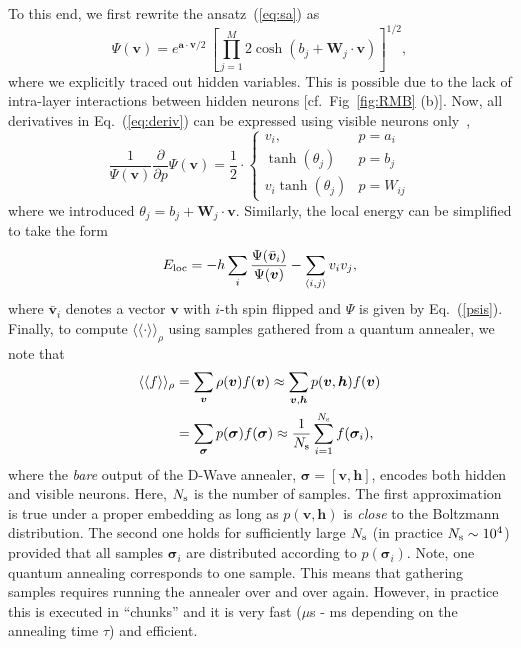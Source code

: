 \documentclass[aps,pra,showpacs,amsmath,amssymb,amsfonts,superscriptaddress,lengthcheck,longbibliography, twocolumn]{revtex4-1}
\newcommand{\bfm}{\boldsymbol}
\begin{document}
To this end, we first rewrite the ansatz~(\ref{eq:sa}) as 
%
\begin{equation}
\Psi(\bfm v) = e^{\bfm a \cdot \bfm v / 2} \, \left[ \prod_{j=1}^M 2 \cosh\left(b_j + \bfm W_{j} \cdot \bfm v\right)\right]^{1/2},
\label{psis}
\end{equation}
%
where we explicitly traced out hidden variables. This is possible due to the lack of intra-layer interactions between  hidden
neurons [cf.~Fig~\ref{fig:RMB}{\color{blue} (b)}]. Now, all derivatives in Eq.~(\ref{eq:deriv}) can be expressed using visible neurons only~\cite{Carleo17},
%
\begin{equation}
   \frac{1}{\Psi(\bfm v)}\frac{\partial}{\partial p} \Psi(\bfm v)  = \frac{1}{2} \cdot
      \begin{cases}
           v_i, &  p = a_i \\
            \tanh\left(\theta_j\right) & p = b_j \\
           v_i  \tanh\left(\theta_j\right) & p = W_{ij}
    \end{cases}
\end{equation}
%
where we introduced $\theta_j = b_j + \bfm W_{j} \cdot \bfm v$. Similarly, the local energy can be simplified to take the form
%
\begin{equation}
E_{\rm loc}  = -h \sum_{i} \frac{\Psi(\bar{\bfm  v}_i)}{\Psi(\bfm v)} - \sum_{\langle i, j\rangle} v_i v_{j},
\end{equation}
%
where $\bar{\bfm  v}_i$ denotes a vector ${\bfm v}$ with $i$-th spin flipped and $\Psi$ is given by Eq.~(\ref{psis}). Finally, to compute 
$\langle\langle\cdot\rangle \rangle_{\rho}$ using samples gathered from a quantum annealer, 
we note that
%
\begin{equation}
\begin{split}
\langle\langle f \rangle \rangle_{\rho} &= \sum_{\bfm v} \rho(\bfm v) f(\bfm v)  
\approx  \sum_{\bfm v, \bfm h} p(\bfm v, \bfm h) f(\bfm v) \\
&= \sum_{\bfm \sigma } p(\bfm \sigma)  f(\bfm \sigma) 
\approx  \frac{1}{N_{\rm s}} \sum_{i=1}^{N_{\rm s}} f(\bfm \sigma_i),
\end{split} 
\end{equation}
%
where the \emph{bare} output of the D-Wave annealer, $\bfm \sigma = [\bfm v, \bfm h]$, encodes both hidden and visible neurons. Here, $N_{\rm s}$
is the number of samples. The first approximation is true under a proper embedding as long as $p(\bfm v, \bfm h)$ is \emph{close} to the Boltzmann distribution. The second one holds for sufficiently large $N_{\rm s}$ (in practice $N_{\rm s} \sim 10^4$) provided that all samples $\bfm \sigma_i$ are distributed according to $p(\bfm \sigma_i)$. Note, one quantum annealing corresponds to one sample. This means that gathering
samples requires running the annealer over and over again. However, in practice this is executed in ``chunks'' and it is very fast ($\mu$s - ms depending on the annealing time $\tau$) and efficient.
\end{document}
